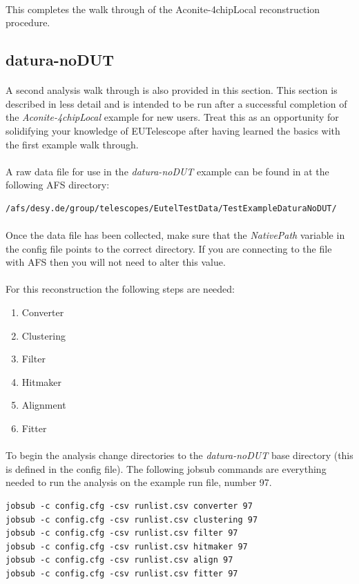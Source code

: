 \documentclass[11pt]{article}
\begin{document}
\paragraph{}
This completes the walk through of the Aconite-4chipLocal reconstruction procedure.
\subsection{datura-noDUT}
\paragraph{}
A second analysis walk through is also provided in this section. This section is described in less detail and is intended to be run after a successful completion of the \textit{Aconite-4chipLocal} example for new users. Treat this as an opportunity for solidifying your knowledge of EUTelescope after having learned the basics with the first example walk through.
\paragraph{}
A raw data file for use in the \textit{datura-noDUT} example can be found in at the following AFS directory:
\begin{verbatim}
/afs/desy.de/group/telescopes/EutelTestData/TestExampleDaturaNoDUT/
\end{verbatim}
\paragraph{}
Once the data file has been collected, make sure that the \textit{NativePath} variable in the config file points to the correct directory. If you are connecting to the file with AFS then you will not need to alter this value.
\paragraph{}
For this reconstruction the following steps are needed:
\begin{enumerate}
\item Converter
\item Clustering
\item Filter
\item Hitmaker
\item Alignment
\item Fitter
\end{enumerate}
\paragraph{}
To begin the analysis change directories to the \textit{datura-noDUT} base directory (this is defined in the config file). The following jobsub commands are everything needed to run the analysis on the example run file, number 97.
\begin{verbatim}
jobsub -c config.cfg -csv runlist.csv converter 97
jobsub -c config.cfg -csv runlist.csv clustering 97
jobsub -c config.cfg -csv runlist.csv filter 97
jobsub -c config.cfg -csv runlist.csv hitmaker 97
jobsub -c config.cfg -csv runlist.csv align 97
jobsub -c config.cfg -csv runlist.csv fitter 97
\end{verbatim}
\end{document}

